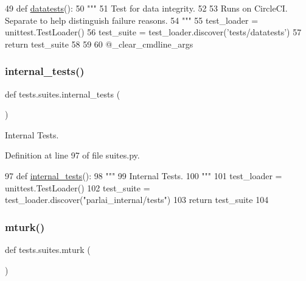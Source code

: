 \begin{DoxyCode}
49 \textcolor{keyword}{def }\hyperlink{namespacetests_1_1suites_a1e7ee73a4d3645058850bc743ad6b668}{datatests}():
50     \textcolor{stringliteral}{"""}
51 \textcolor{stringliteral}{    Test for data integrity.}
52 \textcolor{stringliteral}{}
53 \textcolor{stringliteral}{    Runs on CircleCI. Separate to help distinguish failure reasons.}
54 \textcolor{stringliteral}{    """}
55     test\_loader = unittest.TestLoader()
56     test\_suite = test\_loader.discover(\textcolor{stringliteral}{'tests/datatests'})
57     \textcolor{keywordflow}{return} test\_suite
58 
59 
60 @\_clear\_cmdline\_args
\end{DoxyCode}
\mbox{\label{namespacetests_1_1suites_aaa84dd961fb392c540b3a116119be21c}} 
\subsubsection{\texorpdfstring{internal\+\_\+tests()}{internal\_tests()}}
{\footnotesize\ttfamily def tests.\+suites.\+internal\+\_\+tests (\begin{DoxyParamCaption}{ }\end{DoxyParamCaption})}

\begin{DoxyVerb}Internal Tests.
\end{DoxyVerb}
 

Definition at line 97 of file suites.\+py.


\begin{DoxyCode}
97 \textcolor{keyword}{def }\hyperlink{namespacetests_1_1suites_aaa84dd961fb392c540b3a116119be21c}{internal\_tests}():
98     \textcolor{stringliteral}{"""}
99 \textcolor{stringliteral}{    Internal Tests.}
100 \textcolor{stringliteral}{    """}
101     test\_loader = unittest.TestLoader()
102     test\_suite = test\_loader.discover(\textcolor{stringliteral}{"parlai\_internal/tests"})
103     \textcolor{keywordflow}{return} test\_suite
104 \end{DoxyCode}
\mbox{\label{namespacetests_1_1suites_a5d5a0bb14f72dd9c86a97cc6ca6add87}} 
\subsubsection{\texorpdfstring{mturk()}{mturk()}}
{\footnotesize\ttfamily def tests.\+suites.\+mturk (\begin{DoxyParamCaption}{ }\end{DoxyParamCaption})}

